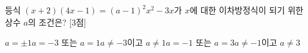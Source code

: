 등식 $(x+2)(4x-1)=(a-1)^2x^2-3x$가 $x$에 대한 이차방정식이 되기 위한 상수 $a$의 조건은? \mbox{[3점]}
\begin{choicesii}{$a=\pm 1$}{$a=-3$ 또는 $a=1$}{$a\ne -3$이고 $a\ne 1$}{$a=-1$ 또는 $a=3$}{$a\ne -1$이고 $a\ne 3$}\end{choicesii}
